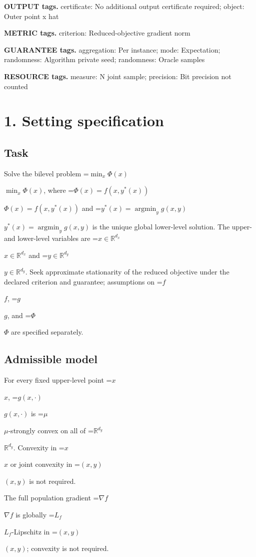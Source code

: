 \documentclass[10pt,a4paper]{article}
\newcommand{\AtlasMath}[1]{\par\begingroup\centering\setbox0=\hbox{$\displaystyle #1$}\ifdim\wd0>1.4\linewidth\typeout{ATLAS WIDE FORMULA: \the\wd0}\fi\ifdim\wd0>\linewidth\resizebox{\linewidth}{!}{\box0}\else\box0\fi\par\endgroup}
\newcommand{\AtlasInlineMath}[1]{\begingroup\setbox0=\hbox{$#1$}\ifdim\wd0>.4\linewidth\endgroup\AtlasMath{#1}\else\endgroup$#1$\fi}
\begin{document}
\textbf{OUTPUT tags.} certificate: No additional output certificate required; object: Outer point x hat



\textbf{METRIC tags.} criterion: Reduced-objective gradient norm



\textbf{GUARANTEE tags.} aggregation: Per instance; mode: Expectation; randomness: Algorithm private seed; randomness: Oracle samples



\textbf{RESOURCE tags.} measure: N joint sample; precision: Bit precision not counted



\section{1. Setting specification}


\subsection{Task}


Solve the bilevel problem \AtlasInlineMath{\min_x\Phi(x)}, where \AtlasInlineMath{\Phi(x)=f(x,y^*(x))} and \AtlasInlineMath{y^*(x)=\operatorname*{argmin}_y g(x,y)} is the unique global lower-level solution. The upper- and lower-level variables are \AtlasInlineMath{x\in\mathbb{R}^{d_x}} and \AtlasInlineMath{y\in\mathbb{R}^{d_y}}. Seek approximate stationarity of the reduced objective under the declared criterion and guarantee; assumptions on \AtlasInlineMath{f}, \AtlasInlineMath{g}, and \AtlasInlineMath{\Phi} are specified separately.



\subsection{Admissible model}


For every fixed upper-level point \AtlasInlineMath{x}, \AtlasInlineMath{g(x,\cdot)} is \AtlasInlineMath{\mu}-strongly convex on all of \AtlasInlineMath{\mathbb{R}^{d_y}}. Convexity in \AtlasInlineMath{x} or joint convexity in \AtlasInlineMath{(x,y)} is not required.



The full population gradient \AtlasInlineMath{\nabla f} is globally \AtlasInlineMath{L_f}-Lipschitz in \AtlasInlineMath{(x,y)}; convexity is not required.
\end{document}
